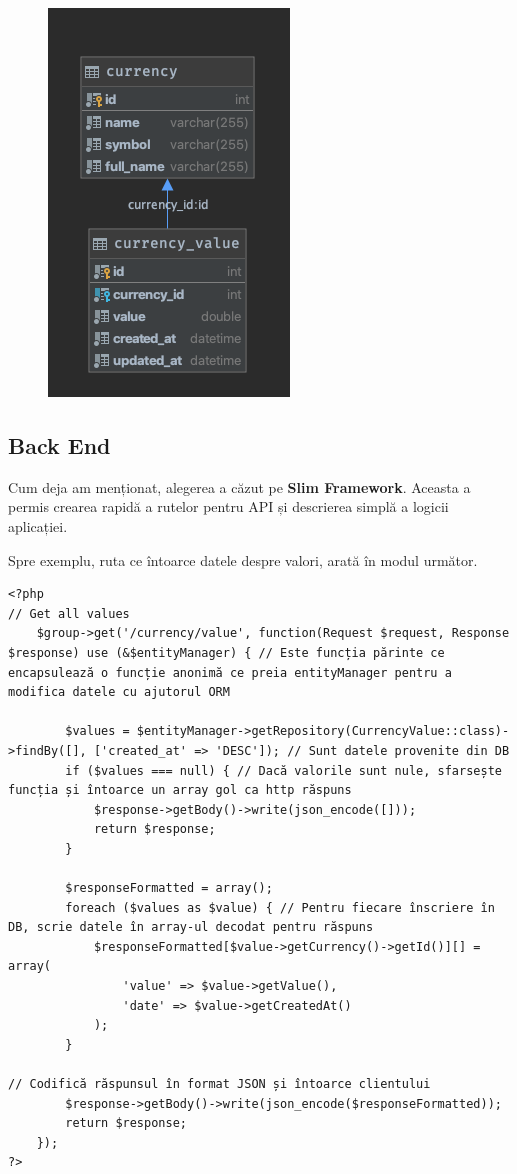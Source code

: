 \documentclass[12pt. a4paper]{report}
\begin{document}
\begin{figure}[H]
\centering
	\includegraphics{database_schema}
\end{figure}
\FloatBarrier

\subsection{Back End}
Cum deja am menționat, alegerea a căzut pe \textbf{Slim Framework}. Aceasta a permis crearea rapidă a rutelor pentru API și descrierea simplă a logicii aplicației.

Spre exemplu, ruta ce întoarce datele despre valori, arată în modul următor.

\begin{verbatim}
<?php
// Get all values
    $group->get('/currency/value', function(Request $request, Response $response) use (&$entityManager) { // Este funcția părinte ce encapsulează o funcție anonimă ce preia entityManager pentru a modifica datele cu ajutorul ORM
   
        $values = $entityManager->getRepository(CurrencyValue::class)->findBy([], ['created_at' => 'DESC']); // Sunt datele provenite din DB
        if ($values === null) { // Dacă valorile sunt nule, sfarsește funcția și întoarce un array gol ca http răspuns
            $response->getBody()->write(json_encode([]));
            return $response;
        }

        $responseFormatted = array();
        foreach ($values as $value) { // Pentru fiecare înscriere în DB, scrie datele în array-ul decodat pentru răspuns
            $responseFormatted[$value->getCurrency()->getId()][] = array(
                'value' => $value->getValue(),
                'date' => $value->getCreatedAt()
            );
        }

// Codifică răspunsul în format JSON și întoarce clientului
        $response->getBody()->write(json_encode($responseFormatted));
        return $response;
    });
?>
\end{verbatim}
\end{document}
